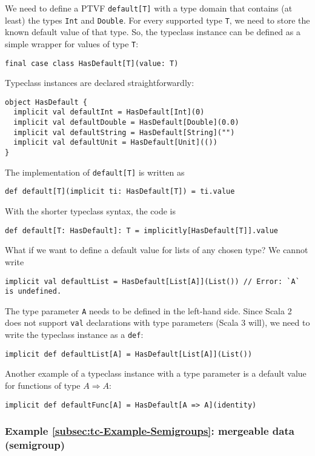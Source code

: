 We need to define a PTVF \lstinline!default[T]! with a type domain
that contains (at least) the types \lstinline!Int! and \lstinline!Double!.
For every supported type \lstinline!T!, we need to store the known
default value of that type. So, the typeclass instance can be defined
as a simple wrapper for values of type \lstinline!T!:
\begin{lstlisting}
final case class HasDefault[T](value: T)
\end{lstlisting}
Typeclass instances are declared straightforwardly:
\begin{lstlisting}
object HasDefault {
  implicit val defaultInt = HasDefault[Int](0)
  implicit val defaultDouble = HasDefault[Double](0.0)
  implicit val defaultString = HasDefault[String]("")
  implicit val defaultUnit = HasDefault[Unit](())
}
\end{lstlisting}
The implementation of \lstinline!default[T]! is written as
\begin{lstlisting}
def default[T](implicit ti: HasDefault[T]) = ti.value
\end{lstlisting}
With the shorter typeclass syntax, the code is
\begin{lstlisting}
def default[T: HasDefault]: T = implicitly[HasDefault[T]].value
\end{lstlisting}

What if we want to define a default value for lists of any chosen
type? We cannot write
\begin{lstlisting}
implicit val defaultList = HasDefault[List[A]](List()) // Error: `A` is undefined.
\end{lstlisting}
The type parameter \lstinline!A! needs to be defined in the left-hand
side. Since Scala 2 does not support \lstinline!val! declarations
with type parameters (Scala 3 will), we need to write the typeclass
instance as a \lstinline!def!:
\begin{lstlisting}
implicit def defaultList[A] = HasDefault[List[A]](List())
\end{lstlisting}

Another example of a typeclass instance with a type parameter is a
default value for functions of type $A\Rightarrow A$:
\begin{lstlisting}
implicit def defaultFunc[A] = HasDefault[A => A](identity)
\end{lstlisting}


\subsubsection{Example \label{subsec:tc-Example-Semigroups}\ref{subsec:tc-Example-Semigroups}:
mergeable data (semigroup)}


